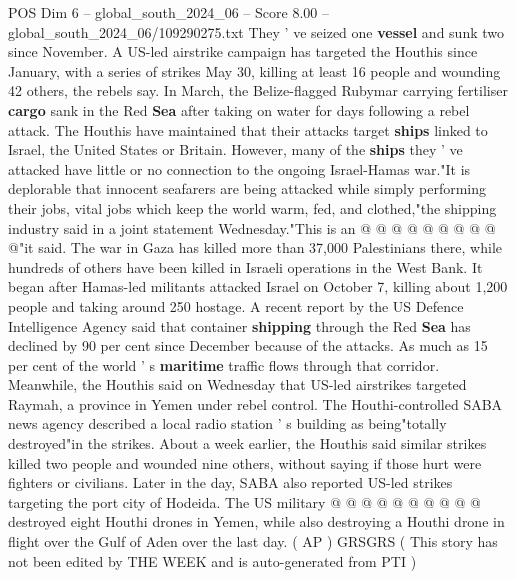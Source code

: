 \begin{textsample}{POS Dim 6 – global\_south\_2024\_06 – Score 8.00 – global\_south\_2024\_06/109290275.txt}
They ' ve seized one \textbf{vessel} and sunk two since November.
A US-led airstrike campaign has targeted the Houthis since January, with a series of strikes May 30, killing at least 16 people and wounding 42 others, the rebels say.
In March, the Belize-flagged Rubymar carrying fertiliser \textbf{cargo} sank in the Red \textbf{Sea} after taking on water for days following a rebel attack.
The Houthis have maintained that their attacks target \textbf{ships} linked to Israel, the United States or Britain.
However, many of the \textbf{ships} they ' ve attacked have little or no connection to the ongoing Israel-Hamas war."It is deplorable that innocent seafarers are being attacked while simply performing their jobs, vital jobs which keep the world warm, fed, and clothed,"the shipping industry said in a joint statement Wednesday."This is an @ @ @ @ @ @ @ @ @ @"it said.
The war in Gaza has killed more than 37,000 Palestinians there, while hundreds of others have been killed in Israeli operations in the West Bank.
It began after Hamas-led militants attacked Israel on October 7, killing about 1,200 people and taking around 250 hostage.
A recent report by the US Defence Intelligence Agency said that container \textbf{shipping} through the Red \textbf{Sea} has declined by 90 per cent since December because of the attacks.
As much as 15 per cent of the world ' s \textbf{maritime} traffic flows through that corridor.
Meanwhile, the Houthis said on Wednesday that US-led airstrikes targeted Raymah, a province in Yemen under rebel control.
The Houthi-controlled SABA news agency described a local radio station ' s building as being"totally destroyed"in the strikes.
About a week earlier, the Houthis said similar strikes killed two people and wounded nine others, without saying if those hurt were fighters or civilians.
Later in the day, SABA also reported US-led strikes targeting the port city of Hodeida.
The US military @ @ @ @ @ @ @ @ @ @ destroyed eight Houthi drones in Yemen, while also destroying a Houthi drone in flight over the Gulf of Aden over the last day. ( AP ) GRSGRS ( This story has not been edited by THE WEEK and is auto-generated from PTI )

\end{textsample}
